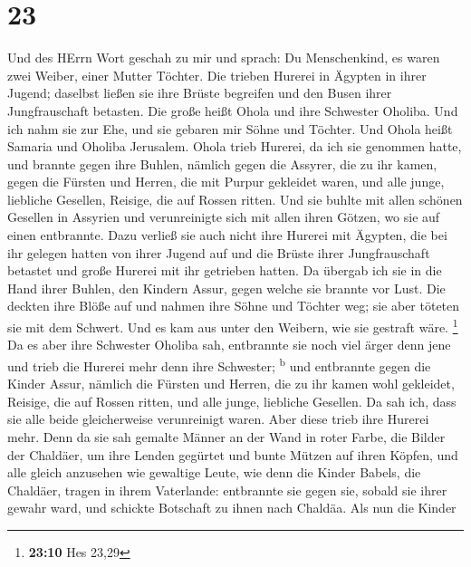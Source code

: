 \hypertarget{section-22}{%
\section{23}\label{section-22}}

 Und des HErrn Wort geschah zu mir und sprach:
 Du Menschenkind, es waren zwei Weiber, einer Mutter
Töchter.  Die trieben Hurerei in Ägypten in ihrer Jugend;
daselbst ließen sie ihre Brüste begreifen und den Busen ihrer
Jungfrauschaft betasten.  Die große heißt Ohola und ihre
Schwester Oholiba. Und ich nahm sie zur Ehe, und sie gebaren mir Söhne
und Töchter. Und Ohola heißt Samaria und Oholiba Jerusalem.
 Ohola trieb Hurerei, da ich sie genommen hatte, und
brannte gegen ihre Buhlen, nämlich gegen die Assyrer, die zu ihr kamen,
 gegen die Fürsten und Herren, die mit Purpur gekleidet
waren, und alle junge, liebliche Gesellen, Reisige, die auf Rossen
ritten.  Und sie buhlte mit allen schönen Gesellen in
Assyrien und verunreinigte sich mit allen ihren Götzen, wo sie auf einen
entbrannte.  Dazu verließ sie auch nicht ihre Hurerei mit
Ägypten, die bei ihr gelegen hatten von ihrer Jugend auf und die Brüste
ihrer Jungfrauschaft betastet und große Hurerei mit ihr getrieben
hatten.  Da übergab ich sie in die Hand ihrer Buhlen, den
Kindern Assur, gegen welche sie brannte vor Lust.  Die
deckten ihre Blöße auf und nahmen ihre Söhne und Töchter weg; sie aber
töteten sie mit dem Schwert. Und es kam aus unter den Weibern, wie sie
gestraft wäre. \footnote{\textbf{23:10} Hes 23,29}  Da es
aber ihre Schwester Oholiba sah, entbrannte sie noch viel ärger denn
jene und trieb die Hurerei mehr denn ihre Schwester; \textsuperscript{b}
 und entbrannte gegen die Kinder Assur, nämlich die
Fürsten und Herren, die zu ihr kamen wohl gekleidet, Reisige, die auf
Rossen ritten, und alle junge, liebliche Gesellen.  Da
sah ich, dass sie alle beide gleicherweise verunreinigt waren.
 Aber diese trieb ihre Hurerei mehr. Denn da sie sah
gemalte Männer an der Wand in roter Farbe, die Bilder der Chaldäer,
 um ihre Lenden gegürtet und bunte Mützen auf ihren
Köpfen, und alle gleich anzusehen wie gewaltige Leute, wie denn die
Kinder Babels, die Chaldäer, tragen in ihrem Vaterlande: 
entbrannte sie gegen sie, sobald sie ihrer gewahr ward, und schickte
Botschaft zu ihnen nach Chaldäa.  Als nun die Kinder
